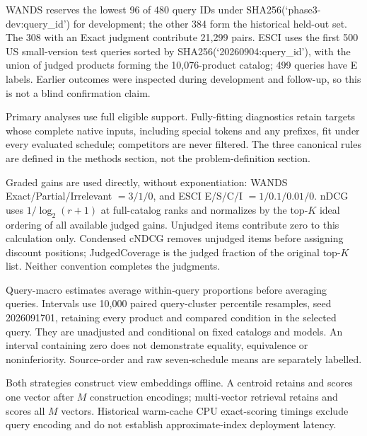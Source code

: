 WANDS reserves the lowest 96 of 480 query IDs under SHA256(`phase3-dev:query_id') for development; the other 384 form the historical held-out set. The 308 with an Exact judgment contribute 21,299 pairs. ESCI uses the first 500 US small-version test queries sorted by SHA256(`20260904:query_id'), with the union of judged products forming the 10,076-product catalog; 499 queries have E labels. Earlier outcomes were inspected during development and follow-up, so this is not a blind confirmation claim.

Primary analyses use full eligible support. Fully-fitting diagnostics retain targets whose complete native inputs, including special tokens and any prefixes, fit under every evaluated schedule; competitors are never filtered. The three canonical rules are defined in the methods section, not the problem-definition section.

Graded gains are used directly, without exponentiation: WANDS Exact/Partial/Irrelevant $=3/1/0$, and ESCI E/S/C/I $=1/0.1/0.01/0$. nDCG uses $1/\log_2(r+1)$ at full-catalog ranks and normalizes by the top-$K$ ideal ordering of all available judged gains. Unjudged items contribute zero to this calculation only. Condensed cNDCG removes unjudged items before assigning discount positions; JudgedCoverage is the judged fraction of the original top-$K$ list. Neither convention completes the judgments.

Query-macro estimates average within-query proportions before averaging queries. Intervals use 10,000 paired query-cluster percentile resamples, seed 2026091701, retaining every product and compared condition in the selected query. They are unadjusted and conditional on fixed catalogs and models. An interval containing zero does not demonstrate equality, equivalence or noninferiority. Source-order and raw seven-schedule means are separately labelled.

Both strategies construct view embeddings offline. A centroid retains and scores one vector after $M$ construction encodings; multi-vector retrieval retains and scores all $M$ vectors. Historical warm-cache CPU exact-scoring timings exclude query encoding and do not establish approximate-index deployment latency.
